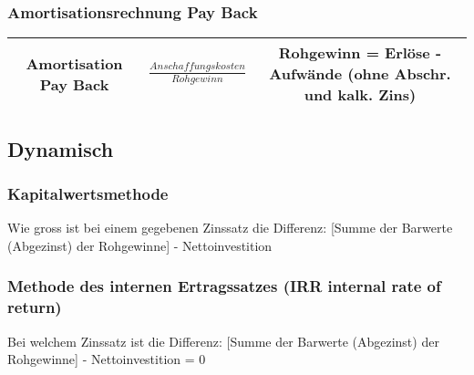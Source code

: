 \subsubsection*{Amortisationsrechnung Pay Back}

\begin{tabular}{|c|c|c|}
\hline 
Amortisation Pay Back & $\frac{Anschaffungskosten}{Rohgewinn}$ & {\footnotesize{Rohgewinn = Erlöse - Aufwände (ohne Abschr. und kalk.
Zins)}}\tabularnewline
\hline 
\end{tabular}


\subsection*{Dynamisch}


\subsubsection*{Kapitalwertsmethode}

Wie gross ist bei einem gegebenen Zinssatz die Differenz: {[}Summe
der Barwerte (Abgezinst) der Rohgewinne{]} - Nettoinvestition


\subsubsection*{Methode des internen Ertragssatzes (IRR internal rate of return)}

Bei welchem Zinssatz ist die Differenz: {[}Summe der Barwerte (Abgezinst)
der Rohgewinne{]} - Nettoinvestition = 0
